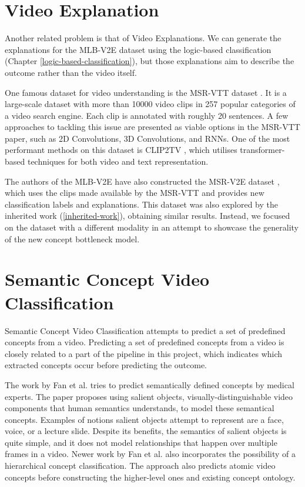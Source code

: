 \section{Video Explanation}

Another related problem is that of Video Explanations. 
We can generate the explanations for the MLB-V2E dataset using the logic-based classification (Chapter \ref{logic-based-classification}), but those explanations aim to describe the outcome rather than the video itself.

One famous dataset for video understanding is the MSR-VTT dataset \cite{RefWorks:RefID:40-jun2016msr-vtt:}. 
It is a large-scale dataset with more than 10000 video clips in 257 popular categories of a video search engine.
Each clip is annotated with roughly 20 sentences. 
A few approaches to tackling this issue are presented as viable options in the MSR-VTT paper, such as 2D Convolutions, 3D Convolutions, and RNNs.
One of the most performant methods on this dataset is CLIP2TV \cite{RefWorks:RefID:41-gao2021clip2tv:}, which utilises transformer-based techniques for both video and text representation.

The authors of the MLB-V2E have also constructed the MSR-V2E dataset \cite{RefWorks:RefID:16-2021automatic}, which uses the clips made available by the MSR-VTT and provides new classification labels and explanations.
This dataset was also explored by the inherited work (\ref{inherited-work}), obtaining similar results.
Instead, we focused on the dataset with a different modality in an attempt to showcase the generality of the new concept bottleneck model.

\section{Semantic Concept Video Classification}

Semantic Concept Video Classification attempts to predict a set of predefined concepts from a video.
Predicting a set of predefined concepts from a video is closely related to a part of the pipeline in this project, which indicates which extracted concepts occur before predicting the outcome. 

The work by Fan et al. \cite{RefWorks:RefID:50-fan2004semantic} tries to predict semantically defined concepts by medical experts.
The paper proposes using salient objects, visually-distinguishable video components that human semantics understands, to model these semantical concepts.
Examples of notions salient objects attempt to represent are a face, voice, or a lecture slide.
Despite its benefits, the semantics of salient objects is quite simple, and it does not model relationships that happen over multiple frames in a video.
Newer work by Fan et al. \cite{RefWorks:RefID:51-jianping2007incorporating} also incorporates the possibility of a hierarchical concept classification. The approach also predicts atomic video concepts before constructing the higher-level ones and existing concept ontology.

